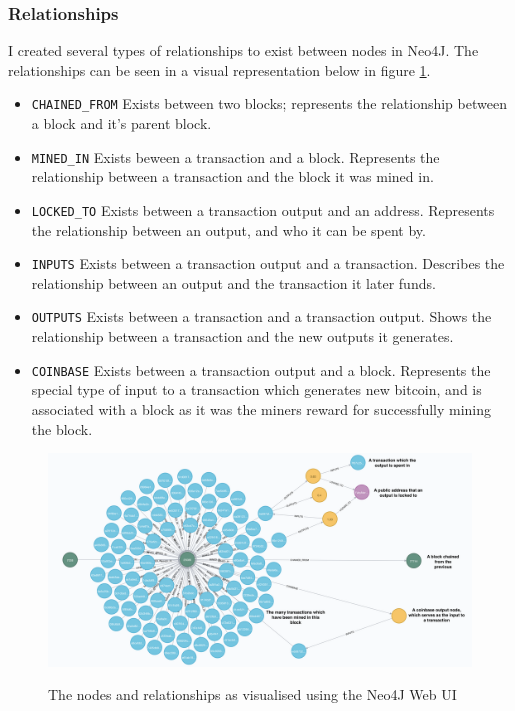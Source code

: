 \subsubsection{Relationships}
I created several types of relationships to exist between nodes in Neo4J. The relationships can be seen in a visual representation below in figure \ref{fig:neo4j-layout}.
\begin{itemize}
    \item \texttt{CHAINED\_FROM} Exists between two blocks; represents the relationship between a block and it's parent block. 
    \item \texttt{MINED\_IN} Exists beween a transaction and a block. Represents the relationship between a transaction and the block it was mined in. 
    \item \texttt{LOCKED\_TO} Exists between a transaction output and an address. Represents the relationship between an output, and who it can be spent by. 
    \item \texttt{INPUTS} Exists between a transaction output and a transaction. Describes the relationship between an output and the transaction it later funds. 
    \item \texttt{OUTPUTS} Exists between a transaction and a transaction output. Shows the relationship between a transaction and the new outputs it generates. 
    \item \texttt{COINBASE} Exists between a transaction output and a block. Represents the special type of input to a transaction which generates new bitcoin, and is associated with a block as it was the miners reward for successfully mining the block. 
\end{itemize}

\begin{figure}[h!]
  \centering
  \includegraphics[width = 15cm]{./figures/neo4j-annotated}\\[0.5cm] 
  \caption{The nodes and relationships as visualised using the Neo4J Web UI}
  \label{fig:neo4j-layout}
\end{figure}

